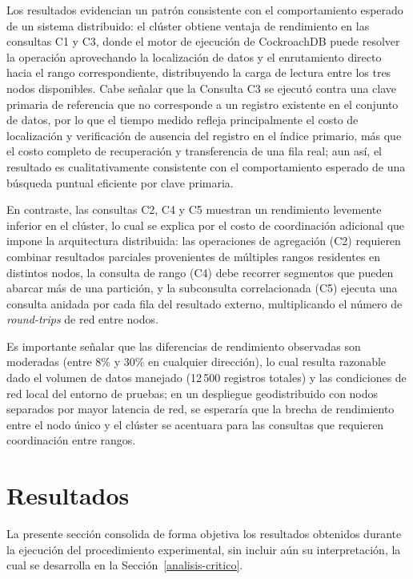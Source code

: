 \documentclass[12pt, a4paper]{article}
\begin{document}
Los resultados evidencian un patrón consistente con el comportamiento esperado de un sistema distribuido: el clúster obtiene ventaja de rendimiento en las consultas C1 y C3, donde el motor de ejecución de CockroachDB puede resolver la operación aprovechando la localización de datos y el enrutamiento directo hacia el rango correspondiente, distribuyendo la carga de lectura entre los tres nodos disponibles. Cabe señalar que la Consulta C3 se ejecutó contra una clave primaria de referencia que no corresponde a un registro existente en el conjunto de datos, por lo que el tiempo medido refleja principalmente el costo de localización y verificación de ausencia del registro en el índice primario, más que el costo completo de recuperación y transferencia de una fila real; aun así, el resultado es cualitativamente consistente con el comportamiento esperado de una búsqueda puntual eficiente por clave primaria.

En contraste, las consultas C2, C4 y C5 muestran un rendimiento levemente inferior en el clúster, lo cual se explica por el costo de coordinación adicional que impone la arquitectura distribuida: las operaciones de agregación (C2) requieren combinar resultados parciales provenientes de múltiples rangos residentes en distintos nodos, la consulta de rango (C4) debe recorrer segmentos que pueden abarcar más de una partición, y la subconsulta correlacionada (C5) ejecuta una consulta anidada por cada fila del resultado externo, multiplicando el número de \textit{round-trips} de red entre nodos.

Es importante señalar que las diferencias de rendimiento observadas son moderadas (entre 8\% y 30\% en cualquier dirección), lo cual resulta razonable dado el volumen de datos manejado (12\,500 registros totales) y las condiciones de red local del entorno de pruebas; en un despliegue geodistribuido con nodos separados por mayor latencia de red, se esperaría que la brecha de rendimiento entre el nodo único y el clúster se acentuara para las consultas que requieren coordinación entre rangos.

\section{Resultados}
\label{resultados}

La presente sección consolida de forma objetiva los resultados obtenidos durante la ejecución del procedimiento experimental, sin incluir aún su interpretación, la cual se desarrolla en la Sección~\ref{analisis-critico}.
\end{document}
